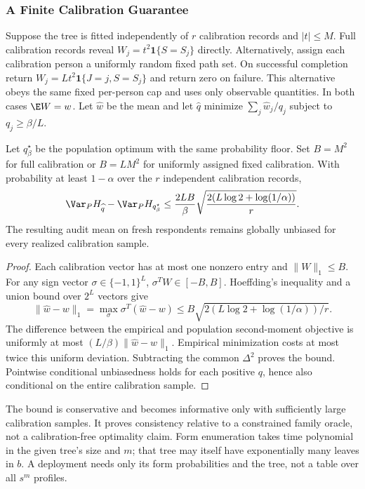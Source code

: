 \subsubsection{A Finite Calibration Guarantee}
Suppose the tree is fitted independently of $r$ calibration records and $|t|\le M$. Full calibration records reveal $W_j=t^2\mathbf1\{S=S_j\}$ directly. Alternatively, assign each calibration person a uniformly random fixed path set. On successful completion return $W_j=L t^2\mathbf1\{J=j,S=S_j\}$ and return zero on failure. This alternative obeys the same fixed per-person cap and uses only observable quantities. In both cases $\E W=w$. Let $\widehat w$ be the mean and let $\widehat q$ minimize $\sum_j\widehat w_j/q_j$ subject to $q_j\ge\beta/L$.

\begin{proposition}\label{prop:pilot}
Let $q_\beta^\star$ be the population optimum with the same probability floor. Set $B=M^2$ for full calibration or $B=LM^2$ for uniformly assigned fixed calibration. With probability at least $1-\alpha$ over the $r$ independent calibration records,
\[
 \Var_P H_{\widehat q}-\Var_P H_{q_\beta^\star}
 \le\frac{2LB}{\beta}\sqrt{\frac{2(L\log2+\log(1/\alpha))}{r}}.
\]
The resulting audit mean on fresh respondents remains globally unbiased for every realized calibration sample.
\end{proposition}
\begin{proof}
Each calibration vector has at most one nonzero entry and $\|W\|_1\le B$. For any sign vector $\sigma\in\{-1,1\}^L$, $\sigma^TW\in[-B,B]$. Hoeffding's inequality and a union bound over $2^L$ vectors give
\[
 \|\widehat w-w\|_1
 =\max_\sigma\sigma^T(\widehat w-w)
 \le B\sqrt{2(L\log2+\log(1/\alpha))/r}.
\]
The difference between the empirical and population second-moment objective is uniformly at most $(L/\beta)\|\widehat w-w\|_1$. Empirical minimization costs at most twice this uniform deviation. Subtracting the common $\Delta^2$ proves the bound. Pointwise conditional unbiasedness holds for each positive $q$, hence also conditional on the entire calibration sample.
\end{proof}
The bound is conservative and becomes informative only with sufficiently large calibration samples. It proves consistency relative to a constrained family oracle, not a calibration-free optimality claim. Form enumeration takes time polynomial in the given tree's size and $m$; that tree may itself have exponentially many leaves in $b$. A deployment needs only its form probabilities and the tree, not a table over all $s^m$ profiles.

